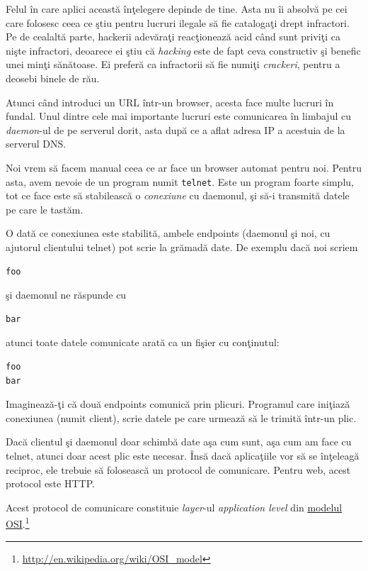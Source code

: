 Felul în care aplici această înţelegere depinde de tine. Asta nu îi absolvă pe
cei care folosesc ceea ce ştiu pentru lucruri ilegale să fie catalogaţi
drept infractori. Pe de cealaltă parte, hackerii adevăraţi reacţionează acid
când sunt priviţi ca nişte infractori, deoarece ei
ştiu că \textsl{hacking} este de fapt ceva constructiv şi benefic unei minţi sănătoase.
Ei preferă ca infractorii să fie numiţi \textsl{crackeri}, pentru a deosebi binele
de rău.

\vspace{1em}\dotfill\vspace{1em}

Atunci când introduci un URL într-un browser, acesta face multe lucruri în fundal.
Unul dintre cele mai importante lucruri este comunicarea în limbajul
 cu \textit{daemon}-ul de pe serverul dorit,
asta după ce a aflat adresa IP a acestuia de la serverul DNS.

Noi vrem să facem manual ceea ce ar face un browser automat pentru noi. Pentru asta,
avem nevoie de un program numit \texttt{telnet}. Este un program foarte simplu, tot ce
face este să stabilească o \textsl{conexiune} cu daemonul, şi să-i transmită datele pe care
le tastăm.

O dată ce conexiunea este stabilită, ambele endpoints (daemonul şi noi, cu ajutorul
clientului telnet) pot scrie la grămadă date. De exemplu dacă noi scriem
\begin{verbatim}
foo
\end{verbatim}
şi daemonul ne răspunde cu
\begin{verbatim}
bar
\end{verbatim}
atunci toate datele comunicate arată ca un fişier cu conţinutul:
\begin{verbatim}
foo
bar
\end{verbatim}

Imaginează-ţi că două endpoints comunică prin plicuri.
Programul care iniţiază conexiunea (numit client), scrie datele pe
care urmează să le trimită într-un plic.

Dacă clientul şi daemonul doar schimbă date {\glqq}aşa cum sunt{\grqq},
aşa cum am face cu telnet, atunci doar acest plic este necesar.
Însă dacă aplicaţiile vor să se înţeleagă reciproc,
ele trebuie să folosească un protocol de comunicare.
Pentru web, acest protocol este HTTP.

Acest protocol de comunicare constituie \textit{layer}-ul \textsl{application level}
din \href{http://en.wikipedia.org/wiki/OSI_model}{modelul OSI}.\footnote{\url{http://en.wikipedia.org/wiki/OSI_model}}

